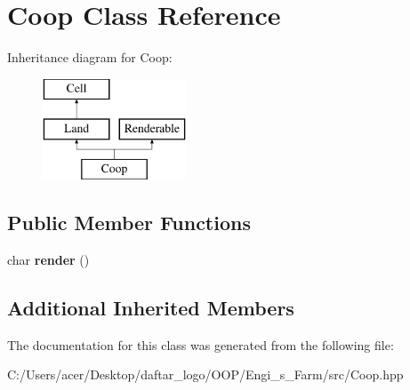 \hypertarget{class_coop}{}\section{Coop Class Reference}
\label{class_coop}
Inheritance diagram for Coop\+:\begin{figure}[H]
\begin{center}
\leavevmode
\includegraphics[height=3.000000cm]{class_coop}
\end{center}
\end{figure}
\subsection*{Public Member Functions}
\begin{DoxyCompactItemize}
\item 
\mbox{\label{class_coop_aa78d597b854b8f711472de5e0249bf78}} 
char {\bfseries render} ()
\end{DoxyCompactItemize}
\subsection*{Additional Inherited Members}


The documentation for this class was generated from the following file\+:\begin{DoxyCompactItemize}
\item 
C\+:/\+Users/acer/\+Desktop/daftar\+\_\+logo/\+O\+O\+P/\+Engi\+\_\+s\+\_\+\+Farm/src/Coop.\+hpp\end{DoxyCompactItemize}
